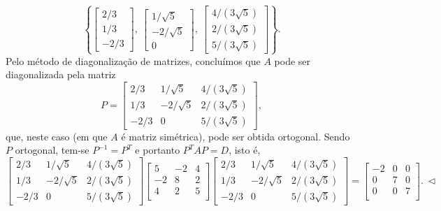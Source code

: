 \begin{ex}
	\begin{equation}
	\left\lbrace
	\begin{bmatrix}
	2/3 \\ 1/3 \\ -2/3
	\end{bmatrix}, \
	\begin{bmatrix}
	1/\sqrt{5} \\ -2/\sqrt{5} \\ 0
	\end{bmatrix}, \
	\begin{bmatrix}
	4/(3\sqrt{5}) \\ 2/(3\sqrt{5}) \\ 5/(3\sqrt{5})
	\end{bmatrix}
	\right\rbrace.
	\end{equation} Pelo método de diagonalização de matrizes, concluímos que $A$ pode ser diagonalizada pela matriz
	\begin{equation}
	P =
	\begin{bmatrix}
	2/3  & 1/\sqrt{5}  & 4/(3\sqrt{5}) \\
	1/3  & -2/\sqrt{5} & 2/(3\sqrt{5}) \\
	-2/3 &       0     & 5/(3\sqrt{5})
	\end{bmatrix},
	\end{equation} que, neste caso (em que $A$ é matriz simétrica), pode ser obtida ortogonal. Sendo $P$ ortogonal, tem-se $P^{-1} = P^T$ e portanto $P^{T} A P =  D$, isto é,
	\begin{equation}
	\begin{bmatrix}
	2/3  & 1/\sqrt{5}  & 4/(3\sqrt{5}) \\
	1/3  & -2/\sqrt{5} & 2/(3\sqrt{5}) \\
	-2/3 &       0     & 5/(3\sqrt{5})
	\end{bmatrix}
	\begin{bmatrix}
	5 & -2 & 4 \\
	-2 & 8 & 2 \\
	4 & 2 & 5 \\
	\end{bmatrix}
	\begin{bmatrix}
	2/3  & 1/\sqrt{5}  & 4/(3\sqrt{5}) \\
	1/3  & -2/\sqrt{5} & 2/(3\sqrt{5}) \\
	-2/3 &       0     & 5/(3\sqrt{5})
	\end{bmatrix} =
	\begin{bmatrix}
	-2& 0 & 0 \\
	0 & 7 & 0 \\
	0 & 0 & 7 \\
	\end{bmatrix}. \ \lhd
	\end{equation}
\end{ex}


